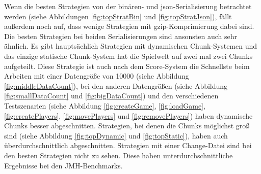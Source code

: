 Wenn die besten Strategien von der binären- und \ac{json}-Serialisierung betrachtet werden (siehe Abbildungen \ref{fig:topStratBin} und \ref{fig:topStratJson}), fällt außerdem noch auf, dass wenige Strategien mit \ac{gzip}-Komprimierung dabei sind. Die besten Strategien bei beiden Serialisierungen sind ansonsten auch sehr ähnlich. Es gibt hauptsächlich Strategien mit dynamischen Chunk-Systemen und das einzige statische Chunk-System hat die Spielwelt auf zwei mal zwei Chunks aufgeteilt. Diese Strategie ist auch nach dem Score-System die Schnellste beim Arbeiten mit einer Datengröße von 10000 (siehe Abbildung \ref{fig:middleDataCount}), bei den anderen Datengrößen (siehe Abbildung \ref{fig:smallDataCount} und \ref{fig:bigDataCount}) und den verschiedenen Testszenarien (siehe Abbildung \ref{fig:createGame}, \ref{fig:loadGame}, \ref{fig:createPlayers}, \ref{fig:movePlayers} und \ref{fig:removePlayers}) haben dynamische Chunks besser abgeschnitten. Strategien, bei denen die Chunks möglichst groß sind (siehe Abbildung \ref{fig:topDynamic} und \ref{fig:topStatic}), haben auch überdurchschnittlich abgeschnitten. Strategien mit einer Change-Datei sind bei den besten Strategien nicht zu sehen. Diese haben unterdurchschnittliche Ergebnisse bei den JMH-Benchmarks.

